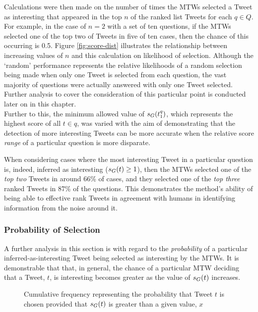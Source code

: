 Calculations were then made on the number of times the MTWs selected a Tweet as interesting that appeared in the top $n$ of the ranked list Tweets for each $q \in Q$. For example, in the case of $n=2$ with a set of ten questions, if the MTWs selected one of the top two of Tweets in five of ten cases, then the chance of this occurring is 0.5. Figure \ref{fig:score-dist} illustrates the relationship between increasing values of $n$ and this calculation on likelihood of selection. Although the `random' performance represents the relative likelihoods of a random selection being made when only one Tweet is selected from each question, the vast majority of questions were actually answered with only one Tweet selected. Further analysis to cover the consideration of this particular point is conducted later on in this chapter.\\
Further to this, the minimum allowed value of $s_G(t^q_1)$, which represents the highest score of all $t \in q$, was varied with the aim of demonstrating that the detection of more interesting Tweets can be more accurate when the relative score \textit{range} of a particular question is more disparate.

When considering cases where the most interesting Tweet in a particular question is, indeed, inferred as interesting ($s_G(t) \geq 1$), then the MTWs selected one of the \textit{top two} Tweets in around 66\% of cases, and they selected one of the \textit{top three} ranked Tweets in 87\% of the questions. This demonstrates the method's ability of being able to effective rank Tweets in agreement with humans in identifying information from the noise around it.


\subsubsection{Probability of Selection}
A further analysis in this section is with regard to the \textit{probability} of a particular inferred-as-interesting Tweet being selected as interesting by the MTWs. It is demonstrable that that, in general, the chance of a particular MTW deciding that a Tweet, $t$, is interesting becomes greater as the value of $s_G(t)$ increases.

\begin{figure}[h]
\centering
{}
\caption{Cumulative frequency representing the probability that Tweet $t$ is chosen provided that $s_G(t)$ is greater than a given value, $x$}
\label{fig:score-cum-dist}
\end{figure}

